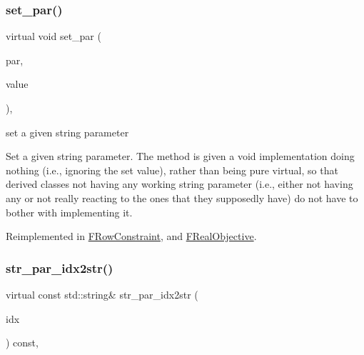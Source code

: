 \subsubsection{\texorpdfstring{set\+\_\+par()}{set\_par()}\hspace{0.1cm}{\footnotesize\ttfamily [3/3]}}
{\footnotesize\ttfamily virtual void set\+\_\+par (\begin{DoxyParamCaption}\item[{const \mbox{\hyperlink{class_s_m_spp__di__unipi__it_1_1_thin_compute_interface_aa3d710629ad8c434286726ad810c3b47}{idx\+\_\+type}}}]{par,  }\item[{const std\+::string \&}]{value }\end{DoxyParamCaption})\hspace{0.3cm}{\ttfamily [inline]}, {\ttfamily [virtual]}}



set a given string parameter 

Set a given string parameter. The method is given a void implementation doing nothing (i.\+e., ignoring the set value), rather than being pure virtual, so that derived classes not having any working string parameter (i.\+e., either not having any or not really reacting to the ones that they supposedly have) do not have to bother with implementing it. 

Reimplemented in \mbox{\hyperlink{class_s_m_spp__di__unipi__it_1_1_f_row_constraint_ae6ba32f23de097cabe6288a463d44645}{F\+Row\+Constraint}}, and \mbox{\hyperlink{class_s_m_spp__di__unipi__it_1_1_f_real_objective_ae6ba32f23de097cabe6288a463d44645}{F\+Real\+Objective}}.

\mbox{\label{class_s_m_spp__di__unipi__it_1_1_thin_compute_interface_ad886220da008681ec350ce43aac421ee}} 
\subsubsection{\texorpdfstring{str\+\_\+par\+\_\+idx2str()}{str\_par\_idx2str()}}
{\footnotesize\ttfamily virtual const std\+::string\& str\+\_\+par\+\_\+idx2str (\begin{DoxyParamCaption}\item[{const \mbox{\hyperlink{class_s_m_spp__di__unipi__it_1_1_thin_compute_interface_aa3d710629ad8c434286726ad810c3b47}{idx\+\_\+type}}}]{idx }\end{DoxyParamCaption}) const\hspace{0.3cm}{\ttfamily [inline]}, {\ttfamily [virtual]}}



